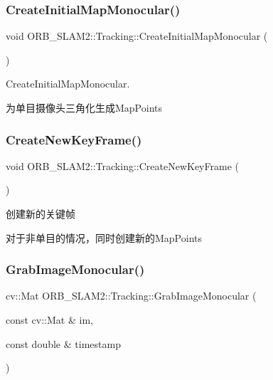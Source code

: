 \subsubsection{\texorpdfstring{Create\+Initial\+Map\+Monocular()}{CreateInitialMapMonocular()}}
{\footnotesize\ttfamily void O\+R\+B\+\_\+\+S\+L\+A\+M2\+::\+Tracking\+::\+Create\+Initial\+Map\+Monocular (\begin{DoxyParamCaption}{ }\end{DoxyParamCaption})\hspace{0.3cm}{\ttfamily [protected]}}



Create\+Initial\+Map\+Monocular. 

为单目摄像头三角化生成\+Map\+Points \mbox{\label{class_o_r_b___s_l_a_m2_1_1_tracking_a8c7fb6c4b1f952524512023df690bf4d}} 
\subsubsection{\texorpdfstring{Create\+New\+Key\+Frame()}{CreateNewKeyFrame()}}
{\footnotesize\ttfamily void O\+R\+B\+\_\+\+S\+L\+A\+M2\+::\+Tracking\+::\+Create\+New\+Key\+Frame (\begin{DoxyParamCaption}{ }\end{DoxyParamCaption})\hspace{0.3cm}{\ttfamily [protected]}}



创建新的关键帧 

对于非单目的情况，同时创建新的\+Map\+Points \mbox{\label{class_o_r_b___s_l_a_m2_1_1_tracking_ad3de28bf6f7638c4da2248c9d595f394}} 
\subsubsection{\texorpdfstring{Grab\+Image\+Monocular()}{GrabImageMonocular()}}
{\footnotesize\ttfamily cv\+::\+Mat O\+R\+B\+\_\+\+S\+L\+A\+M2\+::\+Tracking\+::\+Grab\+Image\+Monocular (\begin{DoxyParamCaption}\item[{const cv\+::\+Mat \&}]{im,  }\item[{const double \&}]{timestamp }\end{DoxyParamCaption})}

